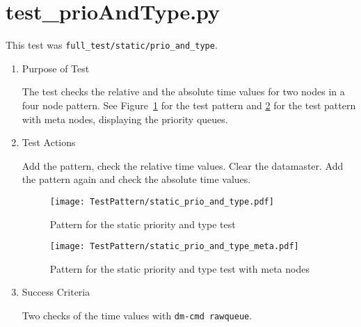 \documentclass[12pt,a4paper]{report}
\begin{document}
\section{test\_prioAndType.py}
This test was \texttt{full\_test/static/prio\_and\_type}.
\begin{enumerate}
  \item Purpose of Test

The test checks the relative and the absolute time values for two nodes
in a four node pattern.
See Figure~\ref{fig:Pattern_for_the_static_priority_and_type_test} for
the test pattern and
\ref{fig:Pattern_for_the_static_priority_and_type_test_with_meta_nodes}
for the test pattern with meta nodes,
displaying the priority queues.
  \item Test Actions

  Add the pattern, check the relative time values. Clear the datamaster.
  Add the pattern again and check the absolute time values.
    \begin{figure}
        \centering
        \texttt{[image: TestPattern/static\_prio\_and\_type.pdf]}
        \caption{Pattern for the static priority and type test}
        \label{fig:Pattern_for_the_static_priority_and_type_test}
    \end{figure}
    \begin{figure}
        \centering
        \texttt{[image: TestPattern/static\_prio\_and\_type\_meta.pdf]}
        \caption{Pattern for the static priority and type test with meta nodes}
        \label{fig:Pattern_for_the_static_priority_and_type_test_with_meta_nodes}
    \end{figure}
  \item Success Criteria

  Two checks of the time values with \texttt{dm-cmd rawqueue}.
\end{enumerate}
\end{document}
